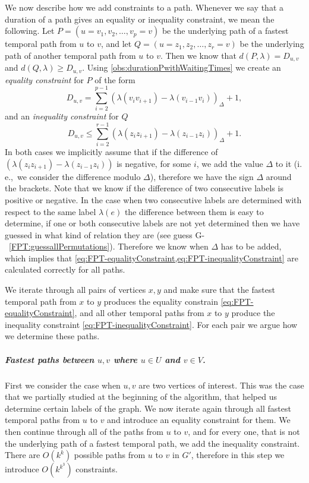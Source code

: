 \documentclass[a4paper,UKenglish,cleveref, autoref, thm-restate, anonymous]{lipics-v2021}
\newcommand{\ie}{i.\,e.,\ }
\begin{document}
We now describe how we add constraints to a path. Whenever we say that a duration of a path gives an equality or inequality constraint, we mean the following.
Let $P=(u=v_1,v_2, \dots, v_p = v)$ be the underlying path of a fastest temporal path from $u$ to $v$,
and let $Q = (u=z_1,z_2, \dots, z_r = v)$ be the underlying path of another temporal path from $u$ to $v$.
Then we know that $d(P,\lambda) = D_{u,v}$ and $d(Q, \lambda) \geq D_{u,v}$.
Using \cref{obs:durationPwithWaitingTimes}
we create an \emph{equality constraint} for $P$
of the form 
\begin{equation}\label{eq:FPT-equalityConstraint}
    D_{u,v} = \sum _ {i=2} ^ {p-1} (\lambda (v_{i}v_{i+1}) - \lambda (v_{i-1}v_i))_\Delta + 1,
\end{equation}
and an \emph{inequality constraint} for $Q$ 
\begin{equation}\label{eq:FPT-inequalityConstraint}
    D_{u,v} \leq \sum _ {i=2} ^ {r-1} (\lambda (z_{i}z_{i+1}) - \lambda (z_{i-1}z_i))_\Delta + 1.
\end{equation}
In both cases we implicitly assume that if the difference of $(\lambda (z_{i}z_{i+1}) - \lambda (z_{i-1}z_i))$ is negative, for some $i$, we add the value $\Delta$ to it (\ie we consider the difference modulo $\Delta$), therefore we have the sign $\Delta$ around the brackets.
Note that we know if the difference of two consecutive labels is positive or negative. 
In the case when two consecutive labels are determined with respect to the same label $\lambda(e)$ the difference between them is easy to determine,
if one or both consecutive labels are not yet determined 
then we have guessed in what kind of relation they are (see guess G-~\ref{FPT:guessallPermutations}).
Therefore we know when $\Delta$ has to be added, which implies that \cref{eq:FPT-equalityConstraint,eq:FPT-inequalityConstraint} are calculated correctly for all paths.

We iterate through all pairs of vertices $x,y$ and make sure that the fastest temporal path from $x$ to $y$ produces the equality constrain \cref{eq:FPT-equalityConstraint},
and all other temporal paths from $x$ to $y$ produce the inequality constraint \cref{eq:FPT-inequalityConstraint}.
For each pair we argue how we determine these paths.

\subparagraph{\boldmath Fastest paths between $u,v$ where $u \in U$ and $v \in V$.}
First we consider the case when $u,v$ are two vertices of interest.
This was the case that we partially studied at the beginning of the algorithm, that helped us determine certain labels of the graph.
We now iterate again through all fastest temporal paths from $u$ to $v$ and introduce an equality constraint for them.
We then continue 
through all of the paths from $u$ to $v$, and for every one, that is not the underlying path of a fastest temporal path, we add the inequality constraint.
There are $O(k^k)$ possible paths from $u$ to $v$ in $G'$, therefore in this step we introduce $O(k^{k^3})$ constraints.
\end{document}
